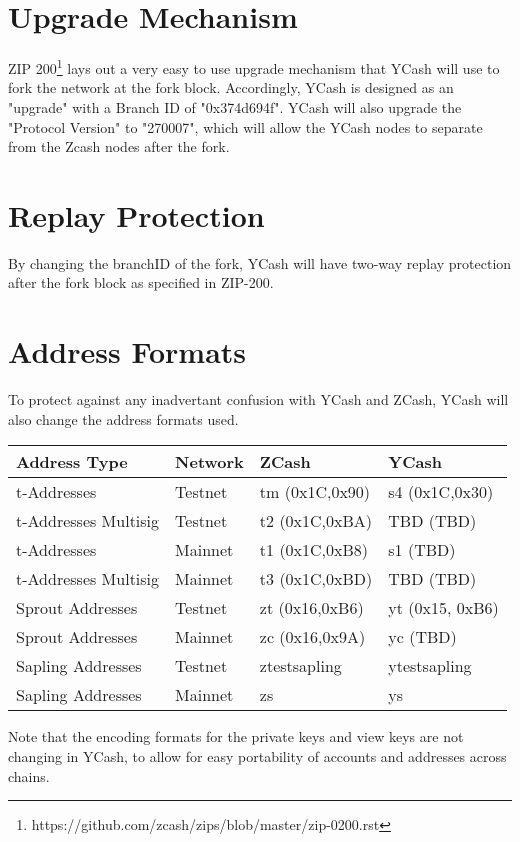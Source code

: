 \documentclass{article}
\begin{document}
\section{Upgrade Mechanism}
ZIP 200\footnote{https://github.com/zcash/zips/blob/master/zip-0200.rst\label{refnote}} lays out a very easy to use upgrade mechanism that YCash will use to fork the network at the fork block. Accordingly, YCash is designed as an "upgrade" with a Branch ID of "0x374d694f". YCash will also upgrade the "Protocol Version" to "270007", which will allow the YCash nodes to separate from the Zcash nodes after the fork. 

\section{Replay Protection}
By changing the branchID of the fork, YCash will have two-way replay protection after the fork block as specified in ZIP-200\footnotemark[\ref{refnote}].


\section{Address Formats}
To protect against any inadvertant confusion with YCash and ZCash, YCash will also change the address formats used. 
\begin{center}
 \begin{tabular}{||l l l l||} 
 \hline
 Address Type & Network & ZCash & YCash \\ [0.5ex] 
 \hline\hline
 t-Addresses & Testnet & tm (0x1C,0x90) & s4 (0x1C,0x30)  \\ 
 \hline
 t-Addresses Multisig & Testnet & t2 (0x1C,0xBA) & TBD (TBD)  \\ 
 \hline
 t-Addresses & Mainnet & t1 (0x1C,0xB8) & s1 (TBD) \\
 \hline
 t-Addresses Multisig & Mainnet & t3 (0x1C,0xBD) & TBD (TBD) \\
 \hline
 \hline
 Sprout Addresses & Testnet & zt (0x16,0xB6) & yt (0x15, 0xB6) \\
 \hline
 Sprout Addresses & Mainnet & zc (0x16,0x9A) & yc (TBD) \\
 \hline
 \hline
 Sapling Addresses & Testnet & ztestsapling & ytestsapling \\
 \hline
 Sapling Addresses & Mainnet & zs & ys \\ [1ex] 
 \hline
\end{tabular}
\end{center}

Note that the encoding formats for the private keys and view keys are not changing in YCash, to allow for easy portability of accounts and addresses across chains. 
\end{document}
